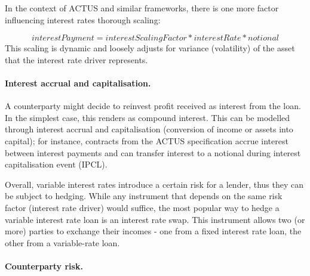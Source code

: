 \documentclass[runningheads]{llncs}
\begin{document}
In the context of ACTUS and similar frameworks, 
there is
one more factor influencing interest rates thorough scaling:

\noindent 
\begin{equation*}
interestPayment=interestScalingFactor*interestRate*notional
\end{equation*}
\noindent
This scaling is dynamic and loosely adjusts for variance (volatility)
of the asset that the interest rate driver represents.

\paragraph*{Interest accrual and capitalisation. }

A counterparty might decide to reinvest profit received as interest
from the %
loan. In the simplest case, this renders as compound
interest. This can be modelled through interest accrual and capitalisation (conversion of income or assets into capital);
for instance, contracts from the ACTUS specification accrue interest
between interest payments and can transfer interest to a notional
during interest capitalisation event (IPCL).

Overall, variable interest rates introduce a certain risk for a lender,
thus they can be %
subject to hedging. While any instrument that depends
on the same risk factor (interest rate driver) would suffice, the
most popular way to hedge a variable interest rate loan is an interest
rate swap. This instrument allows two (or more) parties to exchange
their incomes - one from a fixed interest rate loan, the other from a variable-rate loan.

\paragraph*{Counterparty risk.}
\end{document}
